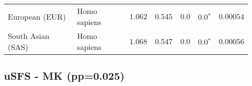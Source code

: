 \begin{center}
\begin{adjustbox}{width = 1\textwidth}
\begin{tabular}{|l|l|r|r|r|r|r|}
                 European (EUR) &         Homo sapiens &                                           $ 1.062$ &                                           $ 0.545$ &            $0.0$ &                  $\bm{0.0{^*}}$ &          $0.00054$ \\
              South Asian (SAS) &         Homo sapiens &                                           $ 1.068$ &                                           $ 0.547$ &            $0.0$ &                  $\bm{0.0{^*}}$ &          $0.00056$ \\
\bottomrule
\end{tabular}
\end{adjustbox}
\newpage
\end{center}
\subsection{uSFS - MK (pp=0.025)} 
